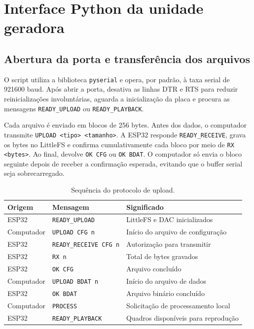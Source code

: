 \section{Interface Python da unidade geradora}

\subsection{Abertura da porta e transferência dos arquivos}

O script  utiliza a biblioteca \texttt{pyserial} e opera, por padrão, à taxa serial de 921600 baud. Após abrir a porta, desativa as linhas DTR e RTS para reduzir reinicializações involuntárias, aguarda a inicialização da placa e procura as mensagens \texttt{READY\_UPLOAD} ou \texttt{READY\_PLAYBACK}.

Cada arquivo é enviado em blocos de 256 bytes. Antes dos dados, o computador transmite \texttt{UPLOAD <tipo> <tamanho>}. A ESP32 responde \texttt{READY\_RECEIVE}, grava os bytes no LittleFS e confirma cumulativamente cada bloco por meio de \texttt{RX <bytes>}. Ao final, devolve \texttt{OK CFG} ou \texttt{OK BDAT}. O computador só envia o bloco seguinte depois de receber a confirmação esperada, evitando que o buffer serial seja sobrecarregado.

\begin{table}[H]
  \centering
  \small
  \caption{Sequência do protocolo de upload.}
  \label{tab:protocolo-upload}
  \begin{tabular}{p{3.0cm}p{4.6cm}p{5.2cm}}
    \toprule
    Origem & Mensagem & Significado \\
    \midrule
    ESP32 & \texttt{READY\_UPLOAD} & LittleFS e DAC inicializados \\
    Computador & \texttt{UPLOAD CFG n} & Início do arquivo de configuração \\
    ESP32 & \texttt{READY\_RECEIVE CFG n} & Autorização para transmitir \\
    ESP32 & \texttt{RX n} & Total de bytes gravados \\
    ESP32 & \texttt{OK CFG} & Arquivo concluído \\
    Computador & \texttt{UPLOAD BDAT n} & Início do arquivo de dados \\
    ESP32 & \texttt{OK BDAT} & Arquivo binário concluído \\
    Computador & \texttt{PROCESS} & Solicitação de processamento local \\
    ESP32 & \texttt{READY\_PLAYBACK} & Quadros disponíveis para reprodução \\
    \bottomrule
  \end{tabular}
\end{table}

